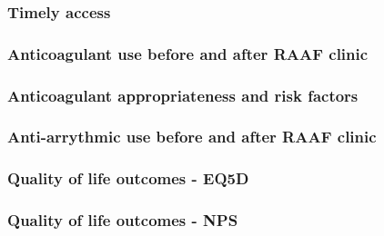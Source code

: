 \documentclass[11pt]{article}
\begin{document}
\subsubsection{Timely access}
\color{violet}
\begin{stlog}\end{stlog}
\color{black}
\subsubsection{Anticoagulant use before and after RAAF clinic}
\color{violet}
\begin{stlog}\end{stlog}
\color{black}
\subsubsection{Anticoagulant appropriateness and risk factors}
\color{violet}
\begin{stlog}\end{stlog}
\color{black}
\subsubsection{Anti-arrythmic use before and after RAAF clinic}
\color{violet}
\begin{stlog}\end{stlog}
\color{black}
\subsubsection{Quality of life outcomes - EQ5D}
\color{violet}
\begin{stlog}\end{stlog}
\color{black}
\subsubsection{Quality of life outcomes - NPS}
\color{violet}
\begin{stlog}\end{stlog}
\clearpage
\color{black}

\end{document}
